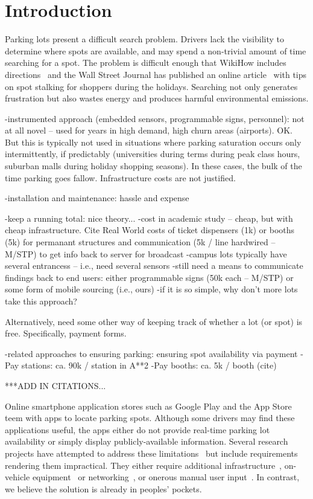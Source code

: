 \section{Introduction}


Parking lots present a difficult search problem. Drivers lack the visibility
to determine where spots are available, and may spend a non-trivial amount of
time searching for a spot. The problem is difficult enough that WikiHow
includes directions~\cite{wikihow-park} and the Wall Street Journal has
published an online article~\cite{wsj-park} with tips on spot stalking for
shoppers during the holidays. Searching not only generates frustration but
also wastes energy and produces harmful environmental emissions.

-instrumented approach (embedded sensors, programmable signs, personnel):  not
    at all novel -- used for years in high demand, high churn areas (airports).
    OK.  But this is typically not used in situations where parking saturation
    occurs only intermittently, if predictably (universities during terms during
    peak class hours, suburban malls during holiday shopping seasons).  In these
    cases, the bulk of the time parking goes fallow.  Infrastructure costs are
    not justified.

-installation and maintenance:  hassle and expense

-keep a running total:  nice theory...
   -cost in academic study -- cheap, but with cheap infrastructure.  Cite
    Real World costs of ticket dispensers (1k) or booths (5k) for permanant structures
    and communication (5k / line hardwired -- M/STP) to get info back to server
    for broadcast
   -campus lots typically have several entrancess -- i.e., need several sensors
   -still need a means to communicate findings back to end users:  either
    programmable signs (50k each -- M/STP) or some form of mobile sourcing (i.e., ours)
   -if it is so simple, why don't more lots take this approach?

Alternatively, need some other way of keeping track of whether a lot (or spot)
    is free.  Specifically, payment forms.

-related approaches to ensuring parking:  ensuring spot availability via payment
   -Pay stations:  ca. 90k / station in A**2
   -Pay booths:  ca. 5k / booth (cite)

***ADD IN CITATIONS...

Online smartphone application stores such as Google Play and the App Store
teem with apps to locate parking spots. Although some drivers may find these
applications useful, the apps either do not provide real-time parking lot
availability or simply display publicly-available information. Several
research projects have attempted to address these limitations~\cite{4212497,
Chen:2012:COS, Delot:2009:CRP, 5062057, Mathur:2010:PDS} but include
requirements rendering them impractical.  They either require additional
infrastructure~\cite{5062057}, on-vehicle equipment~\cite{Mathur:2010:PDS}
or networking~\cite{Delot:2009:CRP, Mathur:2010:PDS}, or onerous manual user
input~\cite{Chen:2012:COS}. In contrast, we believe the solution is already
in peoples' pockets.

